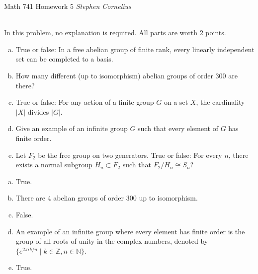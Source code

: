 \documentclass{article}
\begin{document}
\begin{center}
    Math 741
    \hfill Homework 5
    \hfill \textit{Stephen Cornelius}
\end{center}



\begin{problem} \\
    In this problem, no explanation is required. All parts are worth 2 points.
    \begin{enumerate}[(a)]
        \item True or false: In a free abelian group of finite rank, every linearly independent set can be completed to a basis.
        \item How many different (up to isomorphism) abelian groups of order $300$ are there?
        \item True or false: For any action of a finite group $G$ on a set $X$, the cardinality $|X|$ divides $|G|$.
        \item Give an example of an infinite group $G$ such that every element of $G$ has finite order.
        \item Let $F_2$ be the free group on two generators. True or false: For every $n$, there exists a normal subgroup $H_n \subset F_2$ such that $F_2/H_n \cong S_n$?
    \end{enumerate}
\end{problem}

\begin{enumerate}[(a)]
    \item True.
    \item There are 4 abelian groups of order 300 up to isomorphism. %
    \item False.
    \item An example of an infinite group where every element has finite order is the group of all roots of unity in the complex numbers, denoted by $\{e^{2\pi i k/n} \mid k \in \mathbb{Z}, n \in \mathbb{N}\}$.
    \item True. %
\end{enumerate}
\end{document}
